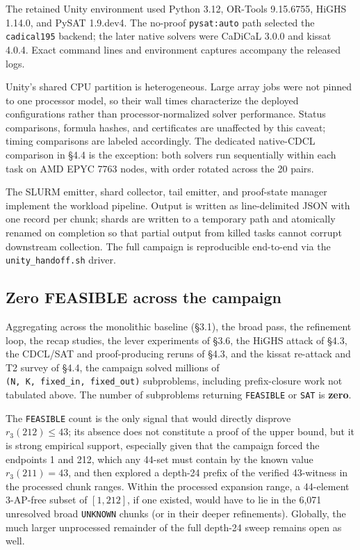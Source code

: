 The retained Unity environment used Python 3.12, OR-Tools 9.15.6755,
HiGHS 1.14.0, and PySAT 1.9.dev4. The no-proof \texttt{pysat:auto}
path selected the \texttt{cadical195} backend; the later native solvers were
CaDiCaL 3.0.0 and kissat 4.0.4. Exact command lines and environment captures
accompany the released logs.

Unity's shared CPU partition is heterogeneous. Large array jobs were not
pinned to one processor model, so their wall times characterize the deployed
configurations rather than processor-normalized solver performance. Status
comparisons, formula hashes, and certificates are unaffected by this caveat;
timing comparisons are labeled accordingly. The dedicated native-CDCL
comparison in §4.4 is the exception: both solvers run sequentially within
each task on AMD EPYC 7763 nodes, with order rotated across the 20 pairs.

The SLURM emitter, shard collector, tail emitter, and proof-state manager
implement the workload pipeline. Output is
written as line-delimited JSON with one record per chunk; shards are
written to a temporary path and atomically renamed on completion so
that partial output from killed tasks cannot corrupt downstream
collection. The full campaign is reproducible end-to-end via the
\texttt{unity\_handoff.sh} driver.

\subsection{Zero FEASIBLE across the campaign}\label{zero-feasible-across-the-campaign}

Aggregating across the monolithic baseline (§3.1), the broad pass, the
refinement loop, the recap studies, the lever experiments of §3.6, the
HiGHS attack of §4.3, the CDCL/SAT and proof-producing reruns of §4.3,
and the kissat re-attack and T2 survey of §4.4, the campaign solved
millions of \texttt{(N,\ K,\ fixed\_in,\ fixed\_out)} subproblems,
including prefix-closure work not tabulated above. The number of
subproblems returning \texttt{FEASIBLE} or \texttt{SAT} is \textbf{zero}.

The \texttt{FEASIBLE} count is the only signal that would directly disprove
$r_3(212) \leq 43$; its absence does not constitute a proof of the upper
bound, but it is strong empirical support, especially given that the
campaign forced the endpoints 1 and 212, which any 44-set must contain by
the known value $r_3(211) = 43$, and then explored a depth-24 prefix of the
verified 43-witness in the processed chunk ranges. Within the processed
expansion range, a 44-element 3-AP-free subset of $[1, 212]$, if one existed,
would have to lie in the 6,071 unresolved broad \texttt{UNKNOWN} chunks (or in
their deeper refinements). Globally, the much larger unprocessed remainder of
the full depth-24 sweep remains open as well.

